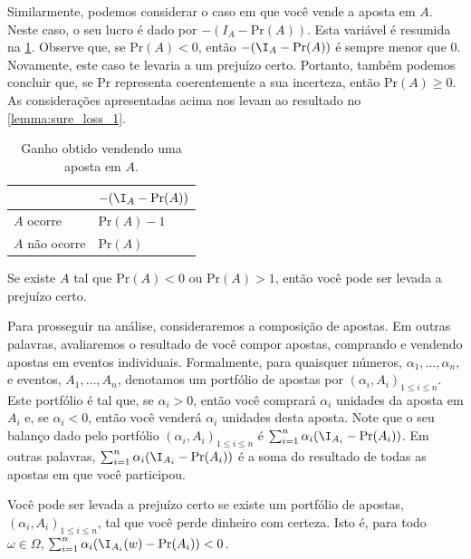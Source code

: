 Similarmente, podemos considerar o caso em que 
você vende a aposta em $A$.
Neste caso, o seu lucro é dado por 
$-(I_{A}-\text{Pr}(A))$.
Esta variável é resumida na \cref{table:aposta_vender}.
Observe que, se $\text{Pr}(A) < 0$, 
então $-(\I_{A}-\text{Pr}(A))$ é sempre menor que $0$.
Novamente, este caso te levaria a um prejuízo certo.
Portanto, também podemos concluir que,
se $\text{Pr}$ representa coerentemente a sua incerteza,
então $\text{Pr}(A) \geq 0$.
As considerações apresentadas acima 
nos levam ao resultado no \cref{lemma:sure_loss_1}.

\begin{table}
 \centering
 \begin{tabular}{|l|l|}
 \hline
  & $-(\I_{A}-\text{Pr}(A))$ \\
  \hline
  $A$ ocorre & $\text{Pr}(A)-1$ \\
  $A$ não ocorre & $\text{Pr}(A)$ \\
  \hline
 \end{tabular}
 \caption{Ganho obtido vendendo uma aposta em $A$.}
 \label{table:aposta_vender}
\end{table}

\begin{lemma}
 \label{lemma:sure_loss_1}
 Se existe $A$ tal que $\text{Pr}(A) < 0$ ou
 $\text{Pr}(A) > 1$, então 
 você pode ser levada a prejuízo certo.
\end{lemma}

Para prosseguir na análise,
consideraremos a composição de apostas.
Em outras palavras, avaliaremos o resultado
de você compor apostas, comprando e 
vendendo apostas em eventos individuais.
Formalmente, para quaisquer números,
$\alpha_{1}, \ldots, \alpha_{n}$,
e eventos, $A_{1}, \ldots, A_{n}$,
denotamos um portfólio de apostas por $(\alpha_{i},A_{i})_{1 \leq i \leq n}$.
Este portfólio é tal que,
se $\alpha_{i} > 0$, então você 
comprará $\alpha_{i}$ unidades da aposta em $A_{i}$ e,
se $\alpha_{i} < 0$, então você 
venderá $\alpha_{i}$ unidades desta aposta.
Note que o seu balanço dado pelo portfólio $(\alpha_{i},A_{i})_{1 \leq i \leq n}$ é 
$\sum_{i=1}^{n}{\alpha_{i}(\I_{A_{i}}-\text{Pr}(A_{i}))}$.
Em outras palavras, $\sum_{i=1}^{n}{\alpha_{i}(\I_{A_{i}}-\text{Pr}(A_{i}))}$ é 
a soma do resultado de todas as apostas 
em que você participou.

\begin{definition}
 Você pode ser levada a prejuízo certo se 
 existe um portfólio de apostas,
 $(\alpha_{i},A_{i})_{1 \leq i \leq n}$,
 tal que você perde dinheiro com certeza. 
 Isto é, para todo $\omega \in \Omega$,
 $\sum_{i=1}^{n}{\alpha_{i}(\I_{A_{i}}(w)-\text{Pr}(A_{i}))} < 0$.
\end{definition}

